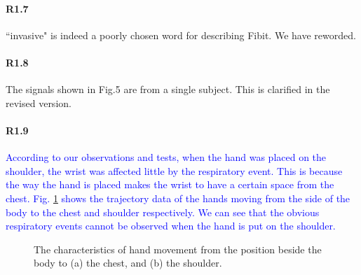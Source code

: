 \paragraph{R1.7} ``invasive" is indeed a poorly chosen word for describing Fibit. We have reworded.
\vspace{-2mm}
\paragraph{R1.8} The signals shown in Fig.5 are from a single subject. This is clarified in the revised version.

\paragraph{R1.9} \textcolor{blue}{According to our observations and tests, when the hand was placed on the shoulder, the wrist was affected little by the respiratory event. This is because the way the hand is placed makes the wrist to have a certain space from the chest. Fig. \ref{Bodyhand} shows the trajectory data of the hands moving from the side of the body to the chest and shoulder respectively. We can see that the obvious respiratory events cannot be observed when the hand is put on the shoulder.}

\begin{figure}[!t]
	\centering
	\caption{The characteristics of hand movement from the position beside the body  to (a)  the chest, and (b) the shoulder.}\label{Bodyhand}
\end{figure}


